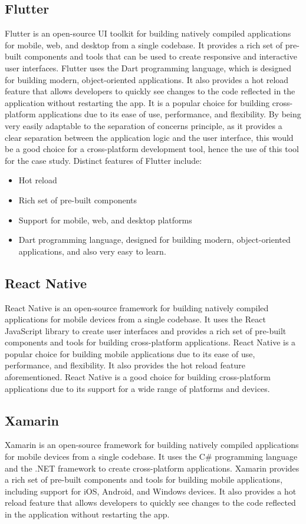 \subsection{Flutter}
Flutter is an open-source UI toolkit for building natively compiled applications for mobile, web, and desktop from a single codebase.
It provides a rich set of pre-built components and tools that can be used to create responsive and interactive user interfaces.
Flutter uses the Dart programming language, which is designed for building modern, object-oriented applications.
It also provides a hot reload feature that allows developers to quickly see changes to the code reflected in the application without restarting the app.
It is a popular choice for building cross-platform applications due to its ease of use, performance, and flexibility.
By being very easily adaptable to the separation of concerns principle, as it provides a clear separation between the application logic and the user interface, this would be a good choice for a cross-platform development tool, hence the use of this tool for the case study.
Distinct features of Flutter include:
\begin{itemize}
    \item Hot reload
    \item Rich set of pre-built components
    \item Support for mobile, web, and desktop platforms
    \item Dart programming language, designed for building modern, object-oriented applications, and also very easy to learn.
\end{itemize}

\subsection{React Native}
React Native is an open-source framework for building natively compiled applications for mobile devices from a single codebase.
It uses the React JavaScript library to create user interfaces and provides a rich set of pre-built components and tools for building cross-platform applications.
React Native is a popular choice for building mobile applications due to its ease of use, performance, and flexibility.
It also provides the hot reload feature aforementioned. 
React Native is a good choice for building cross-platform applications due to its support for a wide range of platforms and devices.

\subsection{Xamarin}
Xamarin is an open-source framework for building natively compiled applications for mobile devices from a single codebase.
It uses the C\# programming language and the .NET framework to create cross-platform applications.
Xamarin provides a rich set of pre-built components and tools for building mobile applications, including support for iOS, Android, and Windows devices.
It also provides a hot reload feature that allows developers to quickly see changes to the code reflected in the application without restarting the app.


\label{chap:ch4}
